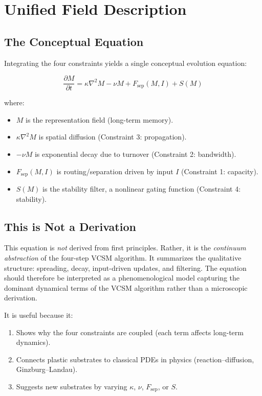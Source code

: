 \documentclass[11pt]{article}
\begin{document}
\section{Unified Field Description}

\subsection{The Conceptual Equation}

Integrating the four constraints yields a single conceptual evolution equation:

\begin{equation}
\frac{\partial M}{\partial t} = \kappa \nabla^2 M - \nu M + F_{\text{sep}}(M, I) + S(M)
\end{equation}

where:
\begin{itemize}
\item $M$ is the representation field (long-term memory).
\item $\kappa \nabla^2 M$ is spatial diffusion (Constraint 3: propagation).
\item $-\nu M$ is exponential decay due to turnover (Constraint 2: bandwidth).
\item $F_{\text{sep}}(M, I)$ is routing/separation driven by input $I$ (Constraint 1: capacity).
\item $S(M)$ is the stability filter, a nonlinear gating function (Constraint 4: stability).
\end{itemize}

\subsection{This is Not a Derivation}

This equation is \emph{not} derived from first principles. Rather, it is the \emph{continuum abstraction} of the four-step VCSM algorithm. It summarizes the qualitative structure: spreading, decay, input-driven updates, and filtering.
The equation should therefore be interpreted as a phenomenological model capturing the dominant dynamical terms of the VCSM algorithm rather than a microscopic derivation.

It is useful because it:
\begin{enumerate}
\item Shows why the four constraints are coupled (each term affects long-term dynamics).
\item Connects plastic substrates to classical PDEs in physics (reaction--diffusion, Ginzburg--Landau).
\item Suggests new substrates by varying $\kappa$, $\nu$, $F_{\text{sep}}$, or $S$.
\end{enumerate}
\end{document}

